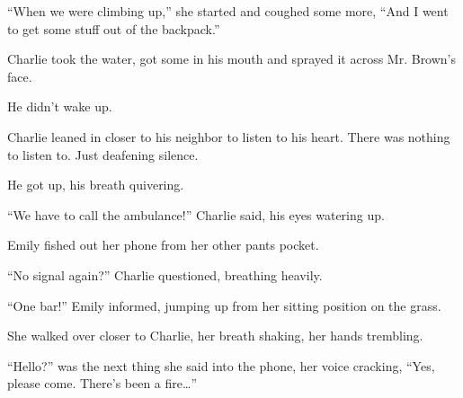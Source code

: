 “When we were climbing up,” she started and coughed some more, “And I went to get some stuff out of the backpack.”

Charlie took the water, got some in his mouth and sprayed it across Mr. Brown’s face.

He didn’t wake up.

Charlie leaned in closer to his neighbor to listen to his heart. There was nothing to listen to. Just deafening silence.

He got up, his breath quivering.

“We have to call the ambulance!” Charlie said, his eyes watering up.

Emily fished out her phone from her other pants pocket.

“No signal again?” Charlie questioned, breathing heavily.

“One bar!” Emily informed, jumping up from her sitting position on the grass.

She walked over closer to Charlie, her breath shaking, her hands trembling.

“Hello?” was the next thing she said into the phone, her voice cracking, “Yes, please come. There’s been a fire…”